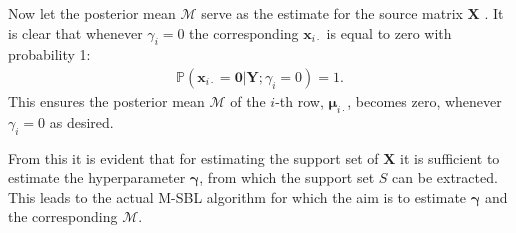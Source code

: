 Now let the posterior mean $\mathcal{M}$ serve as the estimate for the source matrix $\mathbf{X}$ \cite[p. 147]{phd_wipf}.
It is clear that whenever $\gamma_i = 0$ the corresponding $\mathbf{x}_{i\cdot}$ is equal to zero with probability 1:
\begin{align*}
\mathbb{P}(\mathbf{x}_{i \cdot} = \mathbf{0} \vert \mathbf{Y} ; \gamma_i = 0) = 1.
\end{align*}
This ensures the posterior mean $\mathcal{M}$ of the $i$-th row, $\boldsymbol{\mu}_{i \cdot}$, becomes zero, whenever $\gamma_i = 0$ as desired.

From this it is evident that for estimating the support set of $\mathbf{X}$ it is sufficient to estimate the hyperparameter $\boldsymbol{\gamma}$, from which the support set $S$ can be extracted.  
This leads to the actual M-SBL algorithm for which the aim is to estimate $\boldsymbol{\gamma}$ and the corresponding $\mathcal{M}$.

